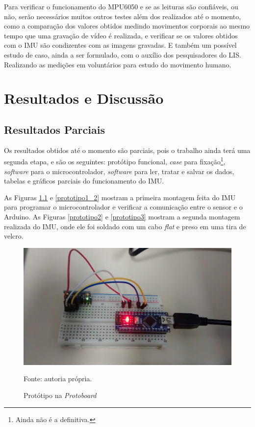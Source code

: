 	Para verificar o funcionamento do MPU6050  e se as leituras são confiáveis, ou não, serão necessários muitos outros testes além dos realizados até o momento, como a comparação dos valores obtidos medindo movimentos corporais ao mesmo tempo que uma gravação de vídeo é realizada, e verificar se os valores obtidos com o IMU são condizentes com as imagens gravadas. E também um possível estudo de caso, ainda a ser formulado, com o auxílio dos pesquisadores do LIS. Realizando as medições em voluntários para estudo do movimento humano. 
	
	
\chapter{Resultados e Discussão}
	\section{Resultados Parciais}
	
	Os resultados obtidos até o momento são parciais, pois o trabalho ainda terá uma segunda etapa, e são os seguintes: protótipo funcional, \textit{case} para fixação\footnote{Ainda não é a definitiva.}, \textit{software} para o microcontrolador, \textit{software} para ler, tratar e salvar os dados, tabelas e gráficos parciais do funcionamento do IMU.
	
	As Figuras \ref{prototipo1} e \ref{prototipo1_2} mostram a primeira montagem feita do IMU para programar o microcontrolador e verificar a comunicação entre o sensor e o Arduino. As Figuras \ref{prototipo2} e \ref{prototipo3} mostram a segunda montagem realizada do IMU, onde ele foi soldado com um cabo \textit{flat} e preso em uma tira de velcro.
	
	\begin{figure}[h]
		\centering
		\includegraphics[keepaspectratio=true,scale=0.15]{figuras/prototipo1.jpg}
		\caption{Protótipo na \textit{Protoboard}}
		Fonte: autoria própria. 
		\label{prototipo1}	
	\end{figure}
	 
